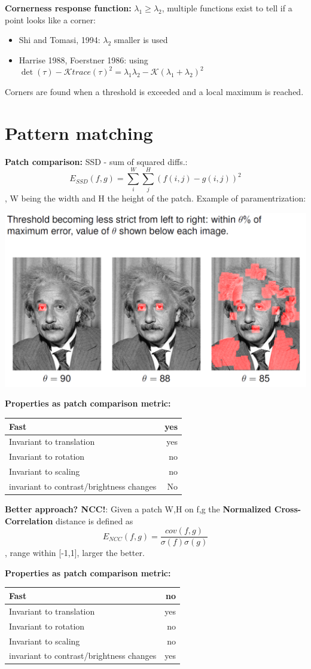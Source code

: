 \textbf{Cornerness response function:} $\lambda_1 \geq \lambda_2$, multiple functions exist to tell if a point looks like a corner: 

\begin{itemize}
    \item Shi and Tomasi, 1994: $\lambda_2$ smaller is used
    \item Harrise 1988, Foerstner 1986: using $\det(\tau) - \mathcal{K} trace(\tau)^2 = \lambda_1 \lambda_2 - \mathcal{K}(\lambda_1+\lambda_2)^2$
\end{itemize}

Corners are found when a threshold is exceeded and a local maximum is reached.

\section{Pattern matching}

\textbf{Patch comparison:} SSD - sum of squared diffs.: $$E_{SSD}(f,g) = \sum_i^W\sum_j^H (f(i,j)-g(i,j))^2$$, W being the width and H the height of the patch. Example of paramentrization:

\includegraphics[width=.6\textwidth]{images/chap3/SSD_thresh}

\textbf{Properties as patch comparison metric:}
\begin{tabular}{lr}
    Fast & yes \\
    \hline    
    Invariant to translation & yes \\
    Invariant to rotation & no \\
    Invariant to scaling & no \\
    \hline
    invariant to contrast/brightness changes & No
\end{tabular}

\textbf{Better approach? NCC!}: Given a patch W,H on f,g the \textbf{Normalized Cross-Correlation} distance is defined as $$E_{NCC}(f,g) = \dfrac{cov(f,g)}{\sigma(f)\sigma(g)}$$, range within [-1,1], larger the better.

\textbf{Properties as patch comparison metric:}
\begin{tabular}{lr}
    Fast & no \\
    \hline    
    Invariant to translation & yes \\
    Invariant to rotation & no \\
    Invariant to scaling & no \\
    \hline
    invariant to contrast/brightness changes & yes
\end{tabular}


